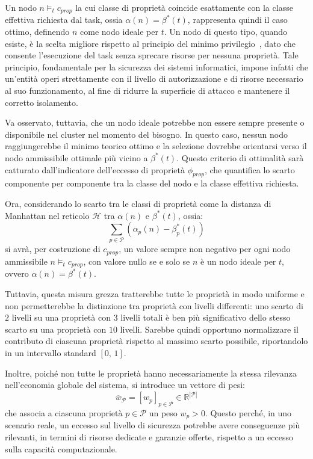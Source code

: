 Un nodo $n \models_t c_{prop}$ la cui classe di proprietà coincide esattamente con la classe effettiva richiesta dal task, ossia $\alpha(n) = \beta^*(t)$, rappresenta quindi il caso ottimo, definendo $n$ come nodo ideale per $t$. Un nodo di questo tipo, quando esiste, è la scelta migliore rispetto al principio del minimo privilegio~\cite{least-privilege}, dato che consente l'esecuzione del task senza sprecare risorse per nessuna proprietà. Tale principio, fondamentale per la sicurezza dei sistemi informatici, impone infatti che un'entità operi strettamente con il livello di autorizzazione e di risorse necessario al suo funzionamento, al fine di ridurre la superficie di attacco e mantenere il corretto isolamento.

Va osservato, tuttavia, che un nodo ideale potrebbe non essere sempre presente o disponibile nel cluster nel momento del bisogno. In questo caso, nessun nodo raggiungerebbe il minimo teorico ottimo e la selezione dovrebbe orientarsi verso il nodo ammissibile ottimale più vicino a $\beta^*(t)$. Questo criterio di ottimalità sarà catturato dall'indicatore dell'eccesso di proprietà $\phi_{prop}$, che quantifica lo scarto componente per componente tra la classe del nodo e la classe effettiva richiesta.

Ora, considerando lo scarto tra le classi di proprietà come la distanza di Manhattan nel reticolo $\mathcal{H}$ tra $\alpha(n)$ e $\beta^*(t)$, ossia: 
\begin{equation}
    \sum_{p \in \mathcal{P}}\left(\alpha_p(n) - \beta^*_p(t)\right)
\end{equation}
si avrà, per costruzione di $c_{prop}$, un valore sempre non negativo per ogni nodo ammissibile $n \models_t c_{prop}$, con valore nullo se e solo se $n$ è un nodo ideale per $t$, ovvero $\alpha(n) = \beta^*(t)$. 

Tuttavia, questa misura grezza tratterebbe tutte le proprietà in modo uniforme e non permetterebbe la distinzione tra proprietà con livelli differenti: uno scarto di $2$ livelli su una proprietà con $3$ livelli totali è ben più significativo dello stesso scarto su una proprietà con $10$ livelli. Sarebbe quindi opportuno normalizzare il contributo di ciascuna proprietà rispetto al massimo scarto possibile, riportandolo in un intervallo standard $[0,\, 1]$. 

Inoltre, poiché non tutte le proprietà hanno necessariamente la stessa rilevanza nell'economia globale del sistema, si introduce un vettore di pesi:
\begin{equation}
    \overline{w}_{\mathcal{P}} = [w_p]_{p \in \mathcal{P}} \in \mathbb{R}^{|\mathcal{P}|}
\end{equation}
che associa a ciascuna proprietà $p \in \mathcal{P}$ un peso $w_p > 0$. Questo perché, in uno scenario reale, un eccesso sul livello di sicurezza potrebbe avere conseguenze più rilevanti, in termini di risorse dedicate e garanzie offerte, rispetto a un eccesso sulla capacità computazionale.

